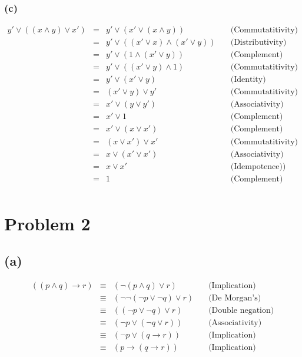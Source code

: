 \documentclass{article} %
\begin{document}
\subsubsection*{(c)}
\[\begin{array}{rllr}
    y' \vee ((x \wedge y) \vee x') &=& y' \vee (x' \vee (x \wedge y)) &\quad\mbox{(Commutatitivity)}\\
                                            &=& y' \vee ((x' \vee x) \wedge (x' \vee y))    &\quad\mbox{(Distributivity)}\\
                                            &=& y' \vee (1 \wedge (x' \vee y)) &\quad\mbox{(Complement)}\\
                                            &=& y' \vee ((x' \vee y) \wedge 1) &\quad\mbox{(Commutatitivity)}\\
                                            &=& y' \vee (x' \vee y)   &\quad\mbox{(Identity)}\\
                                            &=& (x' \vee y) \vee y'   &\quad\mbox{(Commutatitivity)}\\
                                            &=& x' \vee (y \vee y')   &\quad\mbox{(Associativity)}\\
                                            &=& x' \vee 1    &\quad\mbox{(Complement)}\\
                                            &=& x' \vee (x \vee x') &\quad\mbox{(Complement)}\\
                                            &=& (x \vee x') \vee x' &\quad\mbox{(Commutatitivity)}\\
                                            &=& x \vee (x' \vee x') &\quad\mbox{(Associativity)}\\
                                            &=& x \vee x' &\quad\mbox{(Idempotence))}\\
                                            &=& 1   &\quad\mbox{(Complement)}\\
\end{array}\]
\section*{Problem 2}
\subsection*{(a)}
\[\begin{array}{rllr}
    ((p \wedge q)\to r) &\equiv& (\neg (p \wedge q) \vee r)   &\quad\mbox{(Implication)}\\
                        &\equiv& (\neg\neg(\neg p \vee \neg q) \vee r)  &\quad\mbox{(De Morgan’s)}\\
                        &\equiv& ((\neg p \vee \neg q) \vee r)  &\quad\mbox{(Double negation)}\\
                        &\equiv& (\neg p \vee (\neg q \vee r)) &\quad\mbox{(Associativity)}\\
                        &\equiv& (\neg p \vee (q \to r))    &\quad\mbox{(Implication)}\\
                        &\equiv& (p \to (q \to r))  &\quad\mbox{(Implication)}\\
\end{array}\]
\end{document}
